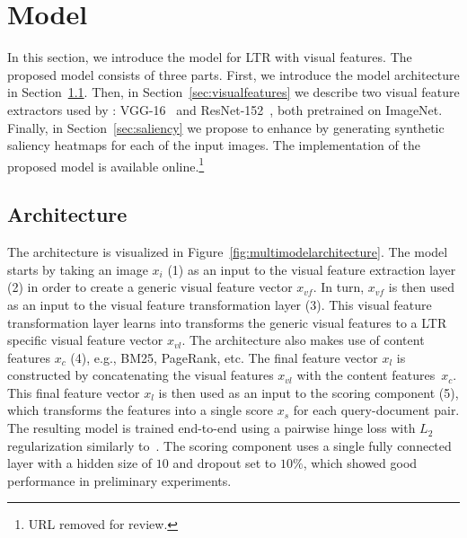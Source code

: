 
\section{\protect\modelname{} Model}
In this section, we introduce the \modelname{} model for \ac{LTR} with visual features.
The proposed model consists of three parts.
First, we introduce the model architecture in Section~\ref{sec:multimodal}.
Then, in Section~\ref{sec:visualfeatures} we describe two visual feature extractors used by \modelname{}:
VGG-16~\cite{simonyan2014very} and ResNet-152~\cite{he2016deep}, both pretrained on ImageNet.
Finally, in Section~\ref{sec:saliency} we propose to enhance \modelname{} by generating synthetic saliency heatmaps for each of the input images.
The implementation of the proposed \modelname{} model is available online.\footnote{URL removed for review.}

\subsection{Architecture} \label{sec:multimodal}
The \modelname{} architecture is visualized in Figure~\ref{fig:multimodelarchitecture}. 
The model starts by taking an image $x_i$ (1) as an input to the visual feature extraction layer (2) in order to create a generic visual feature vector $x_{vf}$. In turn, $x_{vf}$ is then used as an input to the visual feature transformation layer (3).
This visual feature transformation layer learns into transforms the generic visual features to a \ac{LTR} specific visual feature vector $x_{vl}$.
%
The \modelname{} architecture also makes use of content features $x_{c}$ (4), e.g., BM25, PageRank, etc.
The final feature vector $x_{l}$ is constructed by concatenating the visual features $x_{vl}$ with the content features~$x_{c}$.
%
This final feature vector $x_{l}$ is then used as an input to the scoring component (5),
which transforms the features into a single score $x_s$ for each query-document pair.
The resulting model is trained end-to-end using a pairwise hinge loss with $L_2$ regularization similarly to~\cite{fan2017learning}.
The scoring component uses a single fully connected layer with a hidden size of $10$ and dropout set to $10\%$,
which showed good performance in preliminary experiments.

